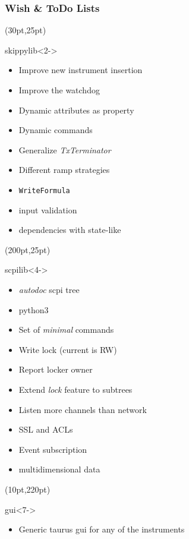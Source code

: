 \documentclass{beamer}
\begin{document}
\begin{frame}
  \frametitle{Wish \& ToDo Lists}
  \begin{textblock*}{0.45\textwidth}(30pt,25pt)
    \begin{block}{skippylib}<2->
      \begin{itemize}
        \item<alert@3> Improve new instrument insertion
        \item Improve the watchdog
        \item Dynamic attributes as property
        \item Dynamic commands
        \item Generalize \emph{TxTerminator}
        \item Different ramp strategies
        \item {\tt WriteFormula}
        \item input validation
        \item dependencies with state-like
      \end{itemize}
    \end{block}
  \end{textblock*}
  \begin{textblock*}{0.45\textwidth}(200pt,25pt)
    \begin{exampleblock}{scpilib}<4->%
      \begin{itemize}
        \item<alert@5> \emph{autodoc} scpi tree
        \item<alert@6> python3
        \item Set of \emph{minimal} commands
        \item Write lock (current is RW)
        \item Report locker owner
        \item Extend \emph{lock} feature to subtrees
        \item Listen more channels than network
        \item SSL and ACLs
        \item Event subscription
        \item multidimensional data
      \end{itemize}
    \end{exampleblock}
  \end{textblock*}
  \begin{textblock*}{0.7\textwidth}(10pt,220pt)
    \begin{alertblock}{gui}<7->
       \begin{itemize}
         \item Generic taurus gui for any of the instruments
       \end{itemize}
    \end{alertblock}
  \end{textblock*}
\end{frame}
\end{document}
